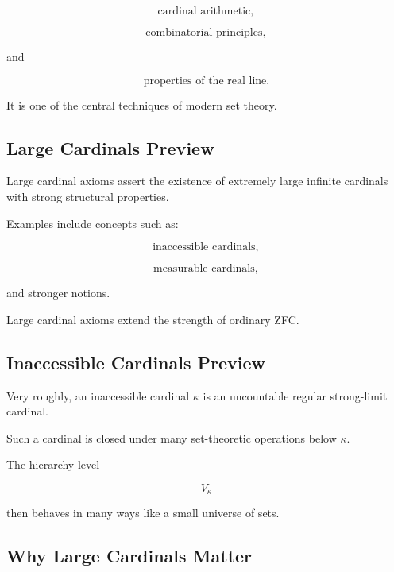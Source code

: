 \[
\boxed{
\text{cardinal arithmetic},
}
\]

\[
\boxed{
\text{combinatorial principles},
}
\]

and

\[
\boxed{
\text{properties of the real line}.
}
\]

It is one of the central techniques of modern set theory.

\subsection{Large Cardinals Preview}
\label{subsec:large-cardinals-preview}

Large cardinal axioms assert the existence of extremely large infinite
cardinals with strong structural properties.

Examples include concepts such as:

\[
\boxed{
\text{inaccessible cardinals},
}
\]

\[
\boxed{
\text{measurable cardinals},
}
\]

and stronger notions.

Large cardinal axioms extend the strength of ordinary ZFC.

\subsection{Inaccessible Cardinals Preview}
\label{subsec:inaccessible-cardinals-preview}

Very roughly, an inaccessible cardinal \(\kappa\) is an uncountable
regular strong-limit cardinal.

Such a cardinal is closed under many set-theoretic operations below
\(\kappa\).

The hierarchy level

\[
V_\kappa
\]

then behaves in many ways like a small universe of sets.

\subsection{Why Large Cardinals Matter}
\label{subsec:why-large-cardinals-matter}

